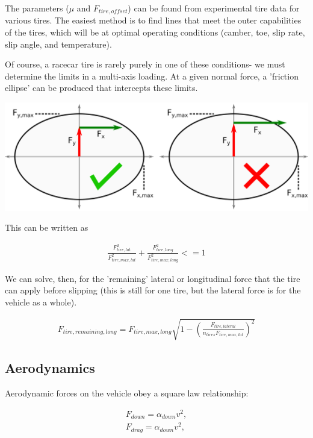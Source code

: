 \documentclass{article}
\begin{document}
The parameters ($\mu$ and $F_{tire,offset}$) can be found from experimental tire data for various tires. The easiest method is to find lines that meet the outer capabilities of the tires, which will be at optimal operating conditions (camber, toe, slip rate, slip angle, and temperature).

Of course, a racecar tire is rarely purely in one of these conditions- we must determine the limits in a multi-axis loading. At a given normal force, a 'friction ellipse' can be produced that intercepts these limits.

\begin{center}
\includegraphics[width=\textwidth]{tire_ellipse.png}
\end{center}

This can be written as

\begin{align}
	\frac{F_{tire,lat}^2}{F_{tire,max,lat}^2} + \frac{F_{tire,long}^2}{F_{tire,max,long}^2} <= 1
\end{align}

We can solve, then, for the 'remaining' lateral or longitudinal force that the tire can apply before slipping (this is still for one tire, but the lateral force is for the vehicle as a whole).

\begin{align}
	F_{tire,remaining,long} = F_{tire,max,long} \sqrt{1-(\frac{F_{tire,lateral}}{n_{tires} F_{tire,max,lat}})^2} 
\end{align}

\subsection{Aerodynamics}

Aerodynamic forces on the vehicle obey a square law relationship:

\begin{align}
	F_{down} = \alpha_{down} v^2, \\
	F_{drag} = \alpha_{down} v^2, \\
\end{align}
\end{document}
